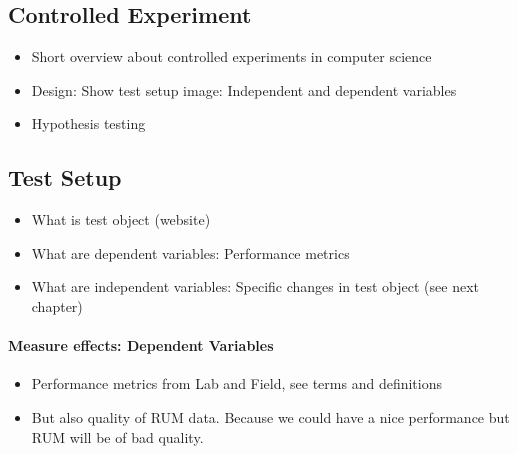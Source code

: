 







\subsection{Controlled Experiment}

\begin{itemize}
\item Short overview about controlled experiments in computer science
\item Design: Show test setup image: Independent and dependent variables
\item Hypothesis testing
\end{itemize}









\subsection{Test Setup}

\begin{itemize}
\item What is test object (website)
\item What are dependent variables: Performance metrics
\item What are independent variables: Specific changes in test object (see next chapter)
\end{itemize}


\paragraph{Measure effects: Dependent Variables}

\begin{itemize}
\item Performance metrics from Lab and Field, see terms and definitions
\item But also quality of RUM data. Because we could have a nice performance but RUM will be of bad quality. 
\end{itemize}


